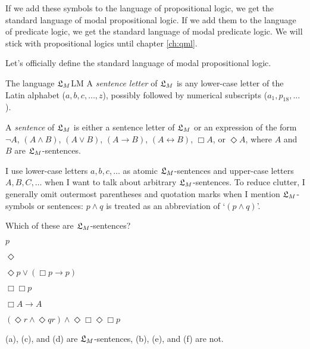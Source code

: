 If we add these symbols to the language of propositional logic, we get the
standard language of modal propositional logic. If we add them to the language
of predicate logic, we get the standard language of modal predicate logic. We
will stick with propositional logics until chapter \ref{ch:qml}.




Let's officially define the standard language of modal propositional logic.

\begin{definition}{The language $\mathfrak{L}_{M}$}{LM}
  A \emph{sentence letter} of $\mathfrak{L}_{M}$ is any lower-case letter of the Latin
  alphabet ($a,b,c,\ldots,z$), possibly followed by numerical subscripts
  ($a_{1}, p_{18}, \ldots$). 

  A \emph{sentence} of $\mathfrak{L}_{M}$ is either a sentence letter of $\mathfrak{L}_{M}$ or an
  expression of the form $\neg A$, $(A \land B)$, $(A \lor B)$, $(A \to B)$,
  $(A \leftrightarrow B)$, $\Box A$, or $\Diamond A$, where $A$ and $B$ are
  $\mathfrak{L}_{M}$-sentences.
\end{definition}


I use lower-case letters $a,b,c,\ldots$ as atomic $\mathfrak{L}_{M}$-sentences and
upper-case letters $A,B,C,\ldots$ when I want to talk about arbitrary
$\mathfrak{L}_{M}$-sentences. To reduce clutter, I generally omit outermost parentheses
and quotation marks when I mention $\mathfrak{L}_{M}$-symbols or sentences: $p \land q$ is
treated as an abbreviation of `$(p \land q)$'.

\begin{exercise}
  Which of these are $\mathfrak{L}_M$-sentences?
  \begin{exlist}
  \item $p$
  \item $\Diamond$
  \item $\Diamond p \lor (\Box p \to p)$
  \item $\Box \Box p$
  \item $\Box A \to A$
  \item $(\Diamond r \land \Diamond qr) \land \Diamond \Box\Diamond\Box p$
  \end{exlist}
\end{exercise}
\begin{solution}
  (a), (c), and (d) are $\mathfrak{L}_{M}$-sentences, (b), (e), and (f) are not.
\end{solution}

